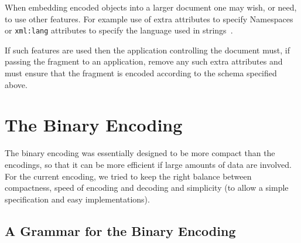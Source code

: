 When embedding \XML encoded \OM objects into a larger \XML document one may wish, or need,
to use other \XML features. For example use of extra \XML attributes to specify \XML
Namespaces~\cite{xmlns} or \lstinline|xml:lang| attributes to specify the language used
in strings~\cite{xml_04}.

If such \XML features are used then the \XML application controlling the document must, if
passing the \OM fragment to an \OM application, remove any such extra attributes and must
ensure that the fragment is encoded according to the schema specified above.

\section{The Binary Encoding}\label{sec_binary}

The binary encoding was essentially designed to be more compact than the \XML encodings,
so that it can be more efficient if large amounts of data are involved. For the current
encoding, we tried to keep the right balance between compactness, speed of encoding and
decoding and simplicity (to allow a simple specification and easy implementations).

\subsection{A Grammar for the Binary Encoding}\label{sec_binary_grammar}

